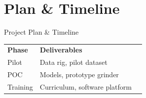 \documentclass{beamer}
\begin{document}
\section{Plan \& Timeline}
\begin{frame}{Project Plan \& Timeline}
  \begin{tabular}{l l l}
    \textbf{Phase} & \textbf{Deliverables} \\
    Pilot  & Data rig, pilot dataset \\
    POC  & Models, prototype grinder \\
    Training  & Curriculum, software platform \\
  \end{tabular}
\end{frame}


\end{document}
